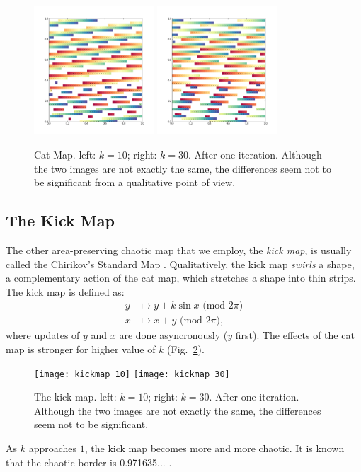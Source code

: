 \documentclass[12pt]{article}
\begin{document}
\begin{figure}[t]
  \centering
  \includegraphics[width=0.4\textwidth]{catmap_10}
  \hspace{2cm}
  \includegraphics[width=0.4\textwidth]{catmap_30}
  \caption{Cat Map. left: $k=10$; right: $k = 30$. After one iteration. 
    Although the two images are not exactly the same, the differences seem not to be significant from a qualitative point of view.
  }
  \label{fig:catmap_demo2}
\end{figure}

\subsection{The Kick Map}
The other area-preserving chaotic map that we employ, the \textit{kick map}, is usually called the Chirikov's Standard Map \citep{ott}.
Qualitatively, the kick map \textit{swirls} a shape, a complementary action of the cat map, which stretches a shape into thin strips.
The kick map is defined as:
\begin{align*}
  y &\mapsto y + k \sin x \mbox{ (mod $2\pi$)} \\
  x &\mapsto x + y \mbox{ (mod $2\pi$)},
\end{align*}
where updates of $y$ and $x$ are done asyncronously ($y$ first).
The effects of the cat map is stronger for higher value of $k$ (Fig.~\ref{fig:kickmap_demo1}).
%
\begin{figure}[t]
  \centering
  \texttt{[image: kickmap\_10]}
  \hspace{2cm}
  \texttt{[image: kickmap\_30]}
  \caption{The kick map. left: $k=10$; right: $k = 30$. After one iteration. 
    Although the two images are not exactly the same, the differences seem not to be significant.
  }
  \label{fig:kickmap_demo1}
\end{figure}
%
As $k$ approaches $1$, the kick map becomes more and more chaotic.
It is known that the chaotic border is 0.971635... \citep{spedia}.
\end{document}
